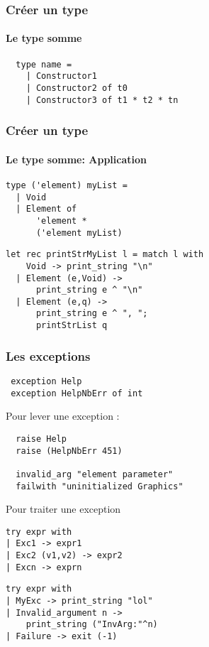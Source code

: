 \begin{frame}[fragile]
	\frametitle{Créer un type}
	\framesubtitle{Le type somme}
	\begin{lstlisting}
  type name =
    | Constructor1 
    | Constructor2 of t0 
    | Constructor3 of t1 * t2 * tn 
	\end{lstlisting}
\end{frame}

\begin{frame}[fragile]
	\frametitle{Créer un type}
	\framesubtitle{Le type somme: Application}
			\begin{lstlisting}
type ('element) myList =
  | Void
  | Element of 
      'element * 
      ('element myList)
			\end{lstlisting}

			\begin{lstlisting}
let rec printStrMyList l = match l with
    Void -> print_string "\n"
  | Element (e,Void) -> 
      print_string e ^ "\n"
  | Element (e,q) -> 
      print_string e ^ ", ";
      printStrList q
			\end{lstlisting}
\end{frame}

\begin{frame}[fragile]
	\frametitle{Les exceptions}
	\begin{lstlisting}
 exception Help
 exception HelpNbErr of int
	\end{lstlisting}
	\begin{block}{Pour lever une exception :}
		\begin{lstlisting}
  raise Help
  raise (HelpNbErr 451)
  
  invalid_arg "element parameter"
  failwith "uninitialized Graphics"
		\end{lstlisting}
	\end{block}
	\begin{block}{Pour traiter une exception}
		\begin{center}
			\begin{minipage}{4.2cm}
				\lstset{basicstyle=\scriptsize}
				\begin{lstlisting}
try expr with 
| Exc1 -> expr1
| Exc2 (v1,v2) -> expr2
| Excn -> exprn
				\end{lstlisting}
			\end{minipage}
			\begin{minipage}{5cm}
				\lstset{basicstyle=\scriptsize}
				\begin{lstlisting}
try expr with 
| MyExc -> print_string "lol"
| Invalid_argument n -> 
    print_string ("InvArg:"^n)
| Failure -> exit (-1)
				\end{lstlisting}
			\end{minipage}
		\end{center}
	\end{block}
\end{frame}
